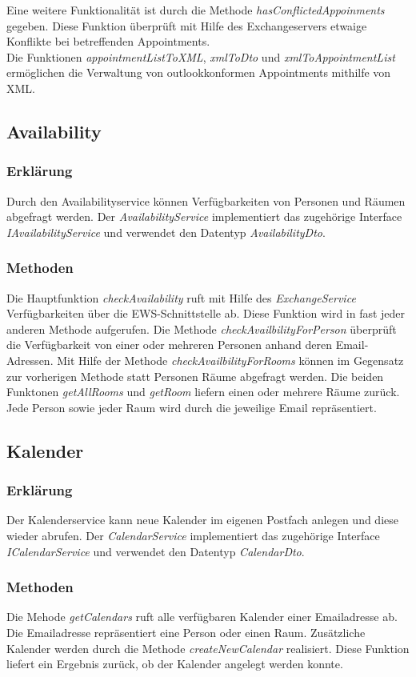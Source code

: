 Eine weitere Funktionalität ist durch die Methode \textit{hasConflictedAppoinments} gegeben. Diese Funktion überprüft mit Hilfe des Exchangeservers etwaige Konflikte bei betreffenden Appointments. \\

Die Funktionen \textit{appointmentListToXML}, \textit{xmlToDto} und \textit{xmlToAppointmentList} ermöglichen die Verwaltung von outlookkonformen Appointments mithilfe von XML.
\subsection{Availability}
\subsubsection{Erklärung}
Durch den Availabilityservice können Verfügbarkeiten von Personen und Räumen abgefragt werden. Der \textit{AvailabilityService} implementiert das zugehörige Interface \textit{IAvailabilityService} und verwendet den Datentyp \textit{AvailabilityDto}.
\subsubsection{Methoden}
Die Hauptfunktion \textit{checkAvailability} ruft mit Hilfe des \textit{ExchangeService} Verfügbarkeiten über die EWS-Schnittstelle ab. Diese Funktion wird in fast jeder anderen Methode aufgerufen. Die Methode \textit{checkAvailbilityForPerson} überprüft die Verfügbarkeit von einer oder mehreren Personen anhand deren Email-Adressen. Mit Hilfe der Methode \textit{checkAvailbilityForRooms} können im Gegensatz zur vorherigen Methode statt Personen Räume abgefragt werden. Die beiden Funktonen \textit{getAllRooms} und \textit{getRoom} liefern einen oder mehrere Räume zurück. Jede Person sowie jeder Raum wird durch die jeweilige Email repräsentiert. 
\subsection{Kalender}
\subsubsection{Erklärung}
Der Kalenderservice kann neue Kalender im eigenen Postfach anlegen und diese wieder abrufen. Der \textit{CalendarService} implementiert das zugehörige Interface \textit{ICalendarService} und verwendet den Datentyp \textit{CalendarDto}.
\subsubsection{Methoden}
Die Mehode \textit{getCalendars} ruft alle verfügbaren Kalender einer Emailadresse ab. Die Emailadresse repräsentiert eine Person oder einen Raum. Zusätzliche Kalender werden durch die Methode \textit{createNewCalendar} realisiert. Diese Funktion liefert ein Ergebnis zurück, ob der Kalender angelegt werden konnte.
